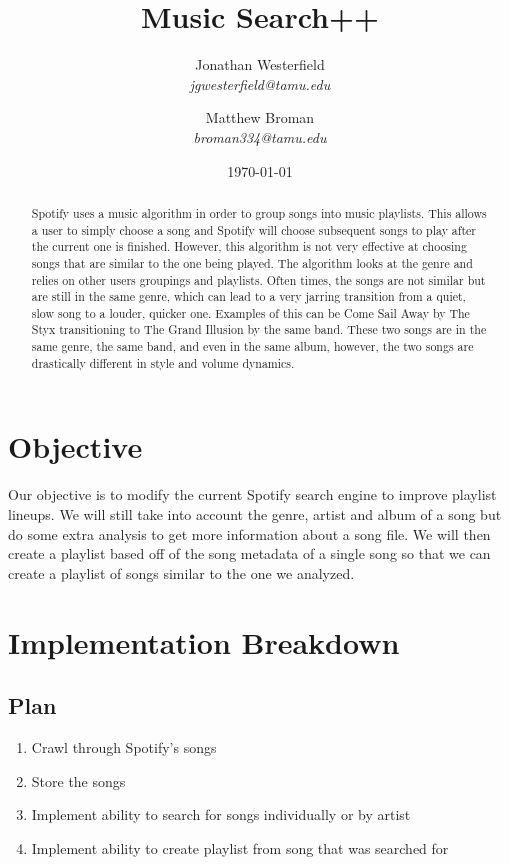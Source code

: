 \documentclass [letter,12pt] {article}
\title{\huge{\textbf{Music Search++}}}
\author{Jonathan Westerfield \\ \textit{jgwesterfield@tamu.edu}
        \and Matthew Broman \\ \textit{broman334@tamu.edu}}
\date{\today}
\begin{document}
\maketitle

\begin{abstract}
    Spotify uses a music algorithm in order to group songs into music
    playlists. This allows a user to simply choose a song and Spotify will
    choose subsequent songs to play after the current one is finished.
    However, this algorithm is not very effective at choosing songs that are
    similar to the one being played. The algorithm looks at the genre and
    relies on other users groupings and playlists. Often times, the songs
    are not similar but are still in the same genre, which can lead to a
    very jarring transition from a quiet, slow song to a louder, quicker
    one. Examples of this can be Come Sail Away by The Styx transitioning to
    The Grand Illusion by the same band. These two songs are in the same
    genre, the same band, and even in the same album, however, the two songs
    are drastically different in style and volume dynamics.
    
\end{abstract}

\newpage

\section{Objective}
    Our objective is to modify the current Spotify search engine to improve playlist lineups. We will still take into account the genre, artist and album of a song but do some extra analysis to get more information about a song file. We will then create a playlist based off of the song metadata of a single song so that we can create a playlist of songs similar to the one we analyzed.
    
\section{Implementation Breakdown}
    \subsection{Plan}
        \begin{enumerate}
            \item Crawl through Spotify’s songs 
            \item Store the songs
            \item Implement ability to search for songs individually 
                or by artist
            \item Implement ability to create playlist from song that 
                was searched for
        \end{enumerate}
        
\end{document}
